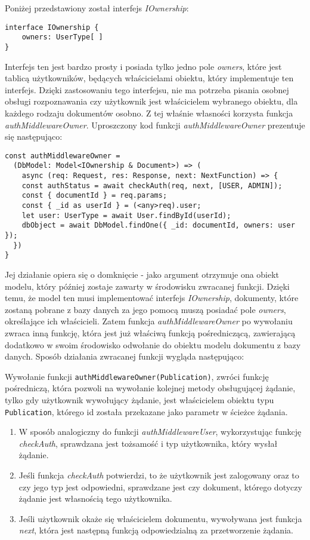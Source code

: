 \documentclass[a4paper,12pt,twoside,openany]{report}
\begin{document}
Poniżej przedstawiony został interfejs \textit{IOwnership}:
\begin{verbatim}
interface IOwnership {
    owners: UserType[ ]
} 
\end{verbatim}
Interfejs ten jest bardzo prosty i posiada tylko jedno pole \textit{owners}, które jest tablicą użytkowników, będących właścicielami obiektu, który implementuje ten interfejs. Dzięki zastosowaniu tego interfejsu, nie ma potrzeba pisania osobnej obsługi rozpoznawania czy użytkownik jest właścicielem wybranego obiektu, dla każdego rodzaju dokumentów osobno. Z tej właśnie własności korzysta funkcja \textit{authMiddlewareOwner}.
\newpage
Uproszczony kod funkcji \textit{authMiddlewareOwner} prezentuje się następująco:
\begin{verbatim}
const authMiddlewareOwner = 
  (DbModel: Model<IOwnership & Document>) => (
    async (req: Request, res: Response, next: NextFunction) => {
    const authStatus = await checkAuth(req, next, [USER, ADMIN]);
    const { documentId } = req.params;
    const { _id as userId } = (<any>req).user;
    let user: UserType = await User.findById(userId);
    dbObject = await DbModel.findOne({ _id: documentId, owners: user });           
  })
}
\end{verbatim}

Jej działanie opiera się o domknięcie - jako argument otrzymuje ona obiekt modelu, który później zostaje zawarty w środowisku zwracanej funkcji. Dzięki temu, że model ten musi implementować interfejs \textit{IOwnership}, dokumenty, które zostaną pobrane z bazy danych za jego pomocą muszą posiadać pole \textit{owners}, określające ich właścicieli.
Zatem funkcja  \textit{authMiddlewareOwner} po wywołaniu zwraca inną funkcję, która jest już właściwą funkcją pośredniczącą, zawierającą dodatkowo w swoim środowisko odwołanie do obiektu modelu dokumentu z bazy danych. Sposób działania zwracanej funkcji wygląda następująco:

Wywołanie funkcji \verb|authMiddlewareOwner(Publication)|, zwróci funkcję pośredniczą, która pozwoli na wywołanie kolejnej metody obsługującej żądanie, tylko gdy użytkownik wywołujący żądanie, jest właścicielem obiektu typu \verb|Publication|, którego id została przekazane jako parametr w ścieżce żądania.

\begin{enumerate}
	
	\item W sposób analogiczny do funkcji \textit{authMiddlewareUser}, wykorzystując funkcję \textit{checkAuth}, sprawdzana jest tożsamość i typ użytkownika, który wysłał żądanie.
	
	\item Jeśli funkcja \textit{checkAuth} potwierdzi, to że użytkownik jest zalogowany oraz to czy jego typ jest odpowiedni, sprawdzane jest czy dokument, którego dotyczy żądanie jest własnością tego użytkownika. 
	
	\item Jeśli użytkownik okaże się właścicielem dokumentu, wywoływana jest funkcja \textit{next}, która jest następną funkcją odpowiedzialną za przetworzenie żądania.
\end{enumerate}
\end{document}
